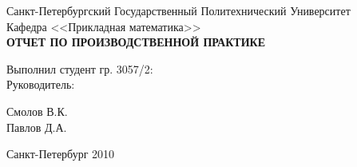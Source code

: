\begin{titlepage}

\begin{center}

\large Санкт-Петербургский Государственный Политехнический Университет \\
Кафедра <<Прикладная математика>> \\ [8.0cm]
\textbf{\textsc{ОТЧЕТ ПО ПРОИЗВОДСТВЕННОЙ ПРАКТИКЕ}}\\[3.0cm]

\begin{minipage}{0.4\textwidth}
\begin{flushleft} \large
  Выполнил студент гр. 3057/2: \\ [1.0cm]
  Руководитель:
\end{flushleft}
\end{minipage}
\begin{minipage}{0.4\textwidth}
\begin{flushright} \large
Смолов В.К. \\ [1.0cm]
Павлов Д.А.
\end{flushright}
\end{minipage}

\vfill

\large Санкт-Петербург 2010

\end{center}
\end{titlepage}
